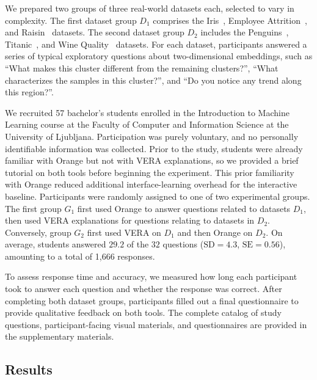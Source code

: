 \documentclass[lettersize,journal]{IEEEtran}
\begin{document}
We prepared two groups of three real-world datasets each, selected to vary in complexity.
The first dataset group $D_1$ comprises the Iris~\cite{Anderson1936}, Employee Attrition~\cite{IbmEmployeeAttrition}, and Raisin~\cite{RaisinDataset} datasets. The second dataset group $D_2$ includes the Penguins~\cite{Horst2020}, Titanic~\cite{Dawson1995}, and Wine Quality~\cite{Cortez2009} datasets. For each dataset, participants answered a series of typical exploratory questions about two-dimensional embeddings, such as ``What makes this cluster different from the remaining clusters?'', ``What characterizes the samples in this cluster?'', and ``Do you notice any trend along this region?''.

We recruited 57 bachelor's students enrolled in the Introduction to Machine Learning course at the Faculty of Computer and Information Science at the University of Ljubljana.
Participation was purely voluntary, and no personally identifiable information was collected.
Prior to the study, students were already familiar with Orange but not with VERA explanations, so we provided a brief tutorial on both tools before beginning the experiment. This prior familiarity with Orange reduced additional interface-learning overhead for the interactive baseline.
Participants were randomly assigned to one of two experimental groups. The first group $G_1$ first used Orange to answer questions related to datasets $D_1$, then used VERA explanations for questions relating to datasets in $D_2$. Conversely, group $G_2$ first used VERA on $D_1$ and then Orange on $D_2$. On average, students answered $29.2$ of the $32$ questions ($\text{SD}= 4.3$, $\text{SE}=0.56$), amounting to a total of 1,666 responses.

To assess response time and accuracy, we measured how long each participant took to answer each question and whether the response was correct. After completing both dataset groups, participants filled out a final questionnaire to provide qualitative feedback on both tools. The complete catalog of study questions, participant-facing visual materials, and questionnaires are provided in the supplementary materials.

\subsection{Results}
\label{sec:user-study:results}
\end{document}
